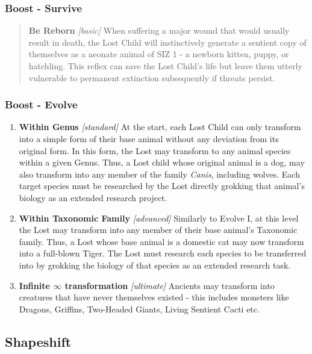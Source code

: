 \documentclass[letterpaper,serif]{rpg-module}
\begin{document}
\subsubsection{Boost - Survive}

\begin{quote}
    \textbf{Be Reborn} \textit{[basic]} When suffering a major wound that would usually result in death, the Lost Child will instinctively generate a sentient copy of themselves as a neonate animal of SIZ 1 - a newborn kitten, puppy, or hatchling. This reflex can save the Lost Child's life but leave them utterly vulnerable to permanent extinction subsequently if threats persist. 
\end{quote}

\subsubsection{Boost - Evolve}
\begin{enumerate}
    \item \textbf{Within Genus} \textit{[standard]}
At the start, each Lost Child can only transform into a simple form of their base animal without any deviation from its original form. In this form, the Lost may transform to any animal species within a given Genus. Thus, a Lost child whose original animal is a dog, may also transform into any member of the family \textit{Canis}, including wolves. Each target species must be researched by the Lost directly grokking that animal's biology as an extended research project.
    \item \textbf{Within Taxonomic Family} \textit{[advanced]}
Similarly to Evolve I, at this level the Lost may transform into any member of their base animal's Taxonomic family. Thus, a Lost whose base animal is a domestic cat may now transform into a full-blown Tiger. The Lost must research each species to be transferred into by grokking the biology of that species as an extended research task. 
\item \textbf{Infinite $\infty$ transformation} \textit{[ultimate]}
Ancients may transform into creatures that have never themselves existed - this includes monsters like Dragons, Griffins, Two-Headed Giants, Living Sentient Cacti etc.
\end{enumerate}

\subsection{Shapeshift}
\end{document}
